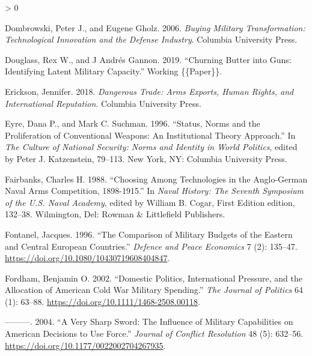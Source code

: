 \documentclass[
]{article}
\newlength{\cslhangindent}
\newenvironment{CSLReferences}[2] %
 {%
  \setlength{\parindent}{0pt}
  \ifodd #1 \everypar{\setlength{\hangindent}{\cslhangindent}}\ignorespaces\fi
  \ifnum #2 > 0
  \setlength{\parskip}{#2\baselineskip}
  \fi
 }%
 {}
\begin{document}
\begin{CSLReferences}{1}{0}
\leavevmode\hypertarget{ref-dombrowski_buyingmilitarytransformation_2006}{}%
Dombrowski, Peter J., and Eugene Gholz. 2006. \emph{Buying {Military Transformation}: {Technological Innovation} and the {Defense Industry}}. {Columbia University Press}.

\leavevmode\hypertarget{ref-douglass_churningbutterguns_2019}{}%
Douglass, Rex W., and J Andrés Gannon. 2019. {``Churning {Butter} into {Guns}: {Identifying Latent Military Capacity}.''} Working \{\{Paper\}\}.

\leavevmode\hypertarget{ref-erickson_dangeroustradearms_2018}{}%
Erickson, Jennifer. 2018. \emph{Dangerous {Trade}: {Arms Exports}, {Human Rights}, and {International Reputation}}. {Columbia University Press}.

\leavevmode\hypertarget{ref-eyre_statusnormsproliferation_1996}{}%
Eyre, Dana P., and Mark C. Suchman. 1996. {``Status, {Norms} and the {Proliferation} of {Conventional Weapons}: {An Institutional Theory Approach}.''} In \emph{The {Culture} of {National Security}: {Norms} and {Identity} in {World Politics}}, edited by Peter J. Katzenstein, 79--113. {New York, NY}: {Columbia University Press}.

\leavevmode\hypertarget{ref-fairbanks_choosingtechnologiesanglogerman_1988}{}%
Fairbanks, Charles H. 1988. {``Choosing Among {Technologies} in the {Anglo}-{German Naval Arms Competition}, 1898-1915.''} In \emph{Naval {History}: {The Seventh Symposium} of the {U}.{S}. {Naval Academy}}, edited by William B. Cogar, First Edition edition, 132--38. {Wilmington, Del}: {Rowman \& Littlefield Publishers}.

\leavevmode\hypertarget{ref-fontanel_comparisonmilitarybudgets_1996}{}%
Fontanel, Jacques. 1996. {``The Comparison of Military Budgets of the Eastern and Central {European} Countries.''} \emph{Defence and Peace Economics} 7 (2): 135--47. \url{https://doi.org/10.1080/10430719608404847}.

\leavevmode\hypertarget{ref-fordham_domesticpoliticsinternational_2002}{}%
Fordham, Benjamin O. 2002. {``Domestic {Politics}, {International Pressure}, and the {Allocation} of {American Cold War Military Spending}.''} \emph{The Journal of Politics} 64 (1): 63--88. \url{https://doi.org/10.1111/1468-2508.00118}.

\leavevmode\hypertarget{ref-fordham_verysharpsword_2004}{}%
---------. 2004. {``A {Very Sharp Sword}: {The Influence} of {Military Capabilities} on {American Decisions} to {Use Force}.''} \emph{Journal of Conflict Resolution} 48 (5): 632--56. \url{https://doi.org/10.1177/0022002704267935}.


\end{CSLReferences}
\end{document}
